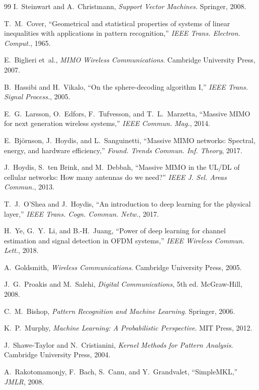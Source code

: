 \documentclass[12pt,a4paper,openany]{ctexrep}
\begin{document}
\begin{thebibliography}{99}
I.~Steinwart and A.~Christmann,
\textit{Support Vector Machines}.
Springer, 2008.

T.~M.~Cover,
``Geometrical and statistical properties of systems of linear inequalities with applications in pattern recognition,''
\textit{IEEE Trans. Electron. Comput.}, 1965.

E.~Biglieri et~al.,
\textit{MIMO Wireless Communications}.
Cambridge University Press, 2007.

B.~Hassibi and H.~Vikalo,
``On the sphere-decoding algorithm I,''
\textit{IEEE Trans. Signal Process.}, 2005.

E.~G.~Larsson, O.~Edfors, F.~Tufvesson, and T.~L.~Marzetta,
``Massive MIMO for next generation wireless systems,''
\textit{IEEE Commun. Mag.}, 2014.

E.~Bj{\"o}rnson, J.~Hoydis, and L.~Sanguinetti,
``Massive MIMO networks: Spectral, energy, and hardware efficiency,''
\textit{Found. Trends Commun. Inf. Theory}, 2017.

J.~Hoydis, S.~ten Brink, and M.~Debbah,
``Massive MIMO in the UL/DL of cellular networks: How many antennas do we need?''
\textit{IEEE J. Sel. Areas Commun.}, 2013.

T.~J.~O'Shea and J.~Hoydis,
``An introduction to deep learning for the physical layer,''
\textit{IEEE Trans. Cogn. Commun. Netw.}, 2017.

H.~Ye, G.~Y.~Li, and B.-H.~Juang,
``Power of deep learning for channel estimation and signal detection in OFDM systems,''
\textit{IEEE Wireless Commun. Lett.}, 2018.

A.~Goldsmith,
\textit{Wireless Communications}.
Cambridge University Press, 2005.

J.~G.~Proakis and M.~Salehi,
\textit{Digital Communications}, 5th ed.
McGraw-Hill, 2008.

C.~M.~Bishop,
\textit{Pattern Recognition and Machine Learning}.
Springer, 2006.

K.~P.~Murphy,
\textit{Machine Learning: A Probabilistic Perspective}.
MIT Press, 2012.

J.~Shawe-Taylor and N.~Cristianini,
\textit{Kernel Methods for Pattern Analysis}.
Cambridge University Press, 2004.

A.~Rakotomamonjy, F.~Bach, S.~Canu, and Y.~Grandvalet,
``SimpleMKL,''
\textit{JMLR}, 2008.


\end{thebibliography}
\end{document}
